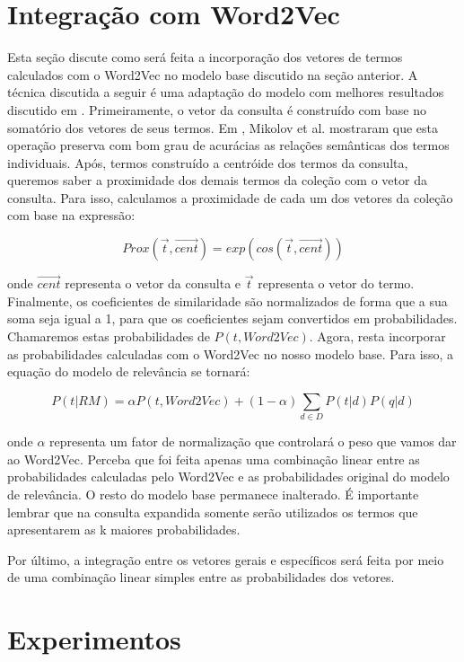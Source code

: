 \documentclass{article}
\begin{document}
\section{Integração com Word2Vec}

Esta seção discute como será feita a incorporação dos vetores de termos calculados com o Word2Vec no modelo base discutido na
seção anterior. A técnica discutida a seguir é uma adaptação do modelo com melhores resultados discutido em \cite{kuzi2016}. 
Primeiramente, o vetor da consulta é construído com base no somatório dos vetores de seus termos. Em \cite{mikolov2013}, Mikolov et al. 
mostraram que esta operação preserva com bom grau de acurácias as relações semânticas dos termos individuais. Após, termos construído
a centróide dos termos da consulta, queremos saber a proximidade dos demais termos da coleção com o vetor da consulta. Para isso, 
calculamos a proximidade de cada um dos vetores da coleção com base na expressão:

\[
Prox(\overrightarrow{t}, \overrightarrow{cent}) = exp(cos(\overrightarrow{t}, \overrightarrow{cent}))
\]

onde $ \overrightarrow{cent} $ representa o vetor da consulta e $ \overrightarrow{t} $ representa o vetor do termo. Finalmente,
os coeficientes de similaridade são normalizados de forma que a sua soma seja igual a 1, para que os coeficientes sejam convertidos
em probabilidades. Chamaremos estas probabilidades de $ P(t, Word2Vec) $. Agora, resta incorporar as probabilidades calculadas 
com o Word2Vec no nosso modelo base. Para isso, a equação do modelo de relevância se tornará:

\[
P(t|RM) = \alpha P(t, Word2Vec) + (1-\alpha) \sum_{d \in D} P(t|d)P(q|d)
\]

onde $ \alpha $ representa um fator de normalização que controlará o peso que vamos dar ao Word2Vec. Perceba que foi feita apenas 
uma combinação linear entre as probabilidades calculadas pelo Word2Vec e as probabilidades original do modelo de relevância. O
resto do modelo base permanece inalterado. É importante lembrar que na consulta expandida somente serão utilizados os termos que
apresentarem as k maiores probabilidades.

Por último, a integração entre os vetores gerais e específicos será feita por meio de uma combinação linear simples entre 
as probabilidades dos vetores.

\section{Experimentos}
\end{document}
